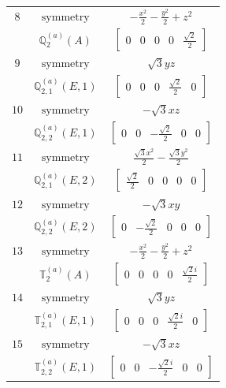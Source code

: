 \documentclass[fleqn,8pt,landscape]{jsarticle}
\begin{document}
\begin{longtable}{ccc}
$ 8 $ & $ \text{symmetry} $ & $ - \frac{x^{2}}{2} - \frac{y^{2}}{2} + z^{2} $ \\
$  $ & $ \mathbb{Q}_{2}^{(a)}(A) $ & $ \begin{bmatrix} 0 & 0 & 0 & 0 & \frac{\sqrt{2}}{2} \end{bmatrix} $ \\ \hline
$ 9 $ & $ \text{symmetry} $ & $ \sqrt{3} y z $ \\
$  $ & $ \mathbb{Q}_{2,1}^{(a)}(E,1) $ & $ \begin{bmatrix} 0 & 0 & 0 & \frac{\sqrt{2}}{2} & 0 \end{bmatrix} $ \\ \hline
$ 10 $ & $ \text{symmetry} $ & $ - \sqrt{3} x z $ \\
$  $ & $ \mathbb{Q}_{2,2}^{(a)}(E,1) $ & $ \begin{bmatrix} 0 & 0 & - \frac{\sqrt{2}}{2} & 0 & 0 \end{bmatrix} $ \\ \hline
$ 11 $ & $ \text{symmetry} $ & $ \frac{\sqrt{3} x^{2}}{2} - \frac{\sqrt{3} y^{2}}{2} $ \\
$  $ & $ \mathbb{Q}_{2,1}^{(a)}(E,2) $ & $ \begin{bmatrix} \frac{\sqrt{2}}{2} & 0 & 0 & 0 & 0 \end{bmatrix} $ \\ \hline
$ 12 $ & $ \text{symmetry} $ & $ - \sqrt{3} x y $ \\
$  $ & $ \mathbb{Q}_{2,2}^{(a)}(E,2) $ & $ \begin{bmatrix} 0 & - \frac{\sqrt{2}}{2} & 0 & 0 & 0 \end{bmatrix} $ \\ \hline
$ 13 $ & $ \text{symmetry} $ & $ - \frac{x^{2}}{2} - \frac{y^{2}}{2} + z^{2} $ \\
$  $ & $ \mathbb{T}_{2}^{(a)}(A) $ & $ \begin{bmatrix} 0 & 0 & 0 & 0 & \frac{\sqrt{2} i}{2} \end{bmatrix} $ \\ \hline
$ 14 $ & $ \text{symmetry} $ & $ \sqrt{3} y z $ \\
$  $ & $ \mathbb{T}_{2,1}^{(a)}(E,1) $ & $ \begin{bmatrix} 0 & 0 & 0 & \frac{\sqrt{2} i}{2} & 0 \end{bmatrix} $ \\ \hline
$ 15 $ & $ \text{symmetry} $ & $ - \sqrt{3} x z $ \\
$  $ & $ \mathbb{T}_{2,2}^{(a)}(E,1) $ & $ \begin{bmatrix} 0 & 0 & - \frac{\sqrt{2} i}{2} & 0 & 0 \end{bmatrix} $ \\ \hline

\end{longtable}
\end{document}
